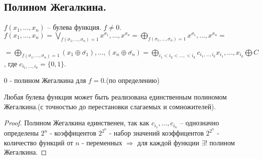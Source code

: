 \subsection{Полином Жегалкина.} 
$f(x_1, \ldots, x_n)$ -- булева функция. $f\neq 0$. \\
$f(x_1, \ldots, x_n)=\bigvee \limits_{f(\sigma_1, \ldots, \sigma_n)=1} x^{\sigma_1}, \ldots, x^{\sigma_n}=\bigoplus \limits_{f(\sigma_1, \ldots, \sigma_n)=1} x^{\sigma_1}, \ldots, x^{\sigma_n}=$ 
\begin{flushright}
$
=\bigoplus \limits_{f(\sigma_1, \ldots, \sigma_n)=1} (x_1\oplus \bar{\sigma_1}),\ldots,(x_n\oplus \bar{\sigma_n})=\bigoplus \limits_{i_1<i_2< \ldots,<i_k} c_{i_1, \ldots, i_k}x_{i_1}, \ldots ,x_{i_k} \bigoplus C $, где  $c_{i_1, \ldots, i_k}=\{0,1\}$.
\end{flushright} 
$0$ - полином Жегалкина для $f=0$.(по определению) 

\begin{statement}
	Любая булева функция может быть реализована единственным полиномом Жегалкина.(с точностью до перестановки слагаемых и сомножителей). 
\end{statement}
\begin{proof}
	Полином Жегалкина единственен, так как $c_{i_1}, \ldots, c_{i_n}$ -- однозначно определены $2^n$ -  коэффицентов $2^{2^n}$ - набор значений коэффицентов $2^{2^n}$ - количество функций от $n$ - переменных $\Rightarrow$ для каждой функции $\exists !$ полином Жегалкина. 
\end{proof}
